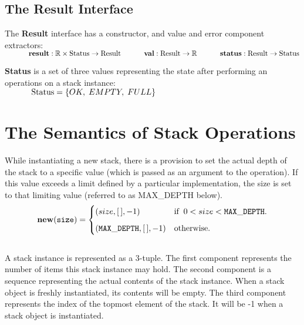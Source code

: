 \documentclass[10pt]{article}
\begin{document}
  \subsection{The Result Interface}
  The \textbf{Result} interface has a constructor, and value and error component extractors:
  \vspace*{6pt}\\\(
  \hspace*{32pt}\textbf{result}: \mathbb{R} \times \mathrm{Status} \rightarrow \mathrm{Result}\vspace*{4pt}\\
  \hspace*{32pt}\textbf{val}: \mathrm{Result} \rightarrow \mathbb{R}\vspace*{4pt}\\
  \hspace*{32pt}\textbf{status}: \mathrm{Result} \rightarrow \mathrm{Status}
  \)\vspace*{6pt}  
  
  \textbf{Status} is a set of three values representing the state after performing an operations on a stack instance: 
   \vspace*{6pt}\\\(\hspace*{32pt}\mathrm{Status} = \{OK, \; EMPTY, \; FULL\} \)

  \section{The Semantics of Stack Operations}
    While instantiating a new stack, there is a provision to set the actual depth of the stack to a specific value (which is passed as an argument to the operation). If this value exceeds a limit defined by a particular implementation, the size is set to that limiting value (referred to as MAX\_DEPTH below).\vspace*{3pt}\\
    \[
        \mathtt{\mathbf{new}(size)} = \begin{cases} (size, [\,], -1) &\mbox{if\;\;} 0 < size < \mathtt{MAX\_DEPTH}. \vspace*{6pt}\\ 
        (\mathtt{MAX\_DEPTH}, [\,], -1) & \mbox{otherwise}. \end{cases} 
    \]
    \vspace*{3pt}\\
    A stack instance is represented as a 3-tuple. The first component represents the number of items this stack instance may hold. The second component is a sequence representing the actual contents of the stack instance. When a stack object is freshly instantiated, its contents will be empty. The third component represents the index of the topmost element of the stack. It will be -1 when a stack object is instantiated. 
\end{document}
